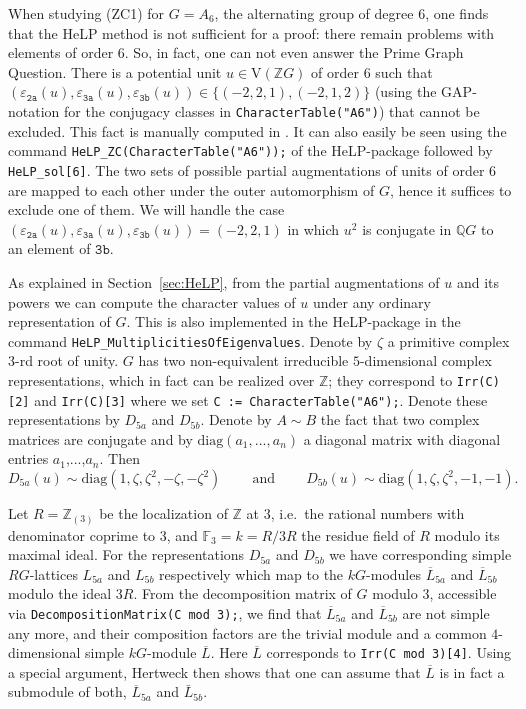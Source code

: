 \documentclass[10pt,a4paper,reqno]{amsart}
\theoremstyle{definition}
\theoremstyle{remark}
\newcommand{\V}{\mathrm{V}}
\newcommand{\ZZ}{\mathbb{Z}}
\newcommand{\QQ}{\mathbb{Q}}
\begin{document}
When studying (ZC1) for $G = A_6$, the alternating group of degree $6$, one finds that the HeLP method is not sufficient for a proof: there remain problems with elements of order $6$. So, in fact, one can not even answer the Prime Graph Question. There is a potential unit $u \in \V(\ZZ G)$ of order $6$ such that $(\varepsilon_{\texttt{2a}}(u), \varepsilon_{\texttt{3a}}(u), \varepsilon_{\texttt{3b}}(u)) \in \{(-2,2,1), (-2,1,2) \}$ (using the \textsf{GAP}-notation for the conjugacy classes in \texttt{CharacterTable("A6")}) that cannot be excluded. This fact is manually computed in \cite{HertweckA6}. It can also easily be seen using the command \texttt{HeLP\_ZC(CharacterTable("A6"));} of the \textsf{HeLP}-package followed by \texttt{HeLP\_sol[6]}. The two sets of possible partial augmentations of units of order $6$ are mapped to each other under the outer automorphism of $G$, hence it suffices to exclude one of them. We will handle the case $(\varepsilon_{\texttt{2a}}(u), \varepsilon_{\texttt{3a}}(u), \varepsilon_{\texttt{3b}}(u)) = (-2,2,1)$ in which $u^2$ is conjugate in $\QQ G$ to an element of $\texttt{3b}$.

As explained in Section~\ref{sec:HeLP}, from the partial augmentations of $u$ and its powers we can compute the character values of $u$ under any ordinary representation of $G$. This is also implemented in the \textsf{HeLP}-package in the command \texttt{HeLP\_MultiplicitiesOfEigenvalues}. Denote by $\zeta$ a primitive complex 3-rd root of unity. $G$ has two non-equivalent irreducible $5$-dimensional complex representations, which in fact can be realized over $\ZZ$; they correspond to \texttt{Irr(C)[2]} and \texttt{Irr(C)[3]} where we set \texttt{C := CharacterTable("A6");}. Denote these representations by $D_{5a}$ and $D_{5b}$. Denote by $A \sim B$ the fact that two complex matrices are conjugate and by $\text{diag}(a_1,...,a_n)$ a diagonal matrix with diagonal entries $a_1$,...,$a_n$. Then
$$D_{5a}(u) \sim \text{diag}(1,\zeta,\zeta^2,-\zeta,-\zeta^2) \qquad \ \text{and} \qquad \ D_{5b}(u) \sim \text{diag}(1,\zeta,\zeta^2,-1,-1).$$

Let $R = \ZZ_{(3)}$ be the localization of $\ZZ$ at $3$, i.e.\ the rational numbers with denominator coprime to $3$, and $\mathbb{F}_3 = k = R/3R$ the residue field of $R$ modulo its maximal ideal. For the representations $D_{5a}$ and $D_{5b}$ we have corresponding simple $RG$-lattices $L_{5a}$ and $L_{5b}$ respectively which map to the $kG$-modules $\overline{L}_{5a}$ and $\overline{L}_{5b}$ modulo the ideal $3R$.  
From the decomposition matrix of $G$ modulo $3$, accessible via \texttt{DecompositionMatrix(C mod 3);}, we find that $\overline{L}_{5a}$ and $\overline{L}_{5b}$ are not simple any more, and their composition factors are the trivial module and a common $4$-dimensional simple $kG$-module $\overline{L}$. Here $\overline{L}$ corresponds to \texttt{Irr(C mod 3)[4]}. Using a special argument, Hertweck then shows that one can assume that $\overline{L}$ is in fact a submodule of both, $\overline{L}_{5a}$ and $\bar{L}_{5b}$. 
\end{document}
